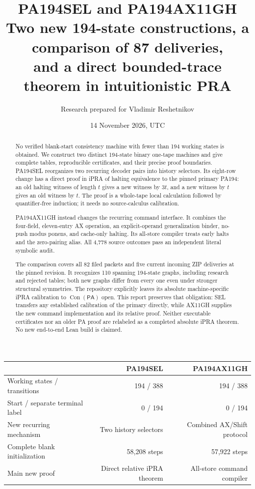 \documentclass[10pt,letterpaper]{article}
\title{\textbf{PA194SEL and PA194AX11GH}\\[5pt]
\large Two new 194-state constructions, a comparison of 87 deliveries,\\
and a direct bounded-trace theorem in intuitionistic PRA}
\author{Research prepared for Vladimir Reshetnikov}
\date{14 November 2026, UTC}
\newcommand{\PA}{\mathsf{PA}}
\newcommand{\Con}{\operatorname{Con}}
\begin{document}
\maketitle
\begin{abstract}
No verified blank-start consistency machine with fewer than 194 working
states is obtained. We construct two distinct 194-state binary one-tape
machines and give complete tables, reproducible certificates, and their
precise proof boundaries. PA194SEL reorganizes two recurring decoder pairs
into history selectors. Its eight-row change has a direct proof in iPRA
of halting equivalence to the pinned primary PA194: an old halting witness
of length $t$ gives a new witness by $3t$, and a new witness by $t$ gives an
old witness by $t$. The proof is a whole-tape local calculation followed by
quantifier-free induction; it needs no source-calculus calibration.

PA194AX11GH instead changes the recurring command interface. It combines
the four-field, eleven-entry AX operation, an explicit-operand
generalization binder, no-push modus ponens, and cache-only halting.
Its all-store compiler treats early halts and the zero-pairing alias.
All 4,778 source outcomes pass an independent literal symbolic audit.

The comparison covers all 82 filed packets and five current incoming ZIP
deliveries at the pinned revision. It recognizes 110 spanning 194-state
graphs, including research and rejected tables; both new graphs differ
from every one even under stronger structural symmetries. The repository
explicitly leaves its absolute machine-specific iPRA calibration to
$\Con(\PA)$ open. This report preserves that obligation: SEL transfers
any established calibration of the primary directly, while AX11GH supplies
the new command implementation and its relative proof. Neither executable
certificates nor an older PA proof are relabeled as a completed absolute
iPRA theorem. No new end-to-end Lean build is claimed.
\end{abstract}
\begin{center}\small
\begin{tabular}{@{}lrr@{}}\toprule
 & PA194SEL & PA194AX11GH\\\midrule
Working states / transitions &194 / 388&194 / 388\\
Start / separate terminal label &0 / 194&0 / 194\\
New recurring mechanism &Two history selectors&Combined AX/Shift protocol\\
Complete blank initialization &58,208 steps&57,922 steps\\
Main new proof &Direct relative iPRA theorem&All-store command compiler\\
\bottomrule\end{tabular}\end{center}
\clearpage\tableofcontents\clearpage
\end{document}
